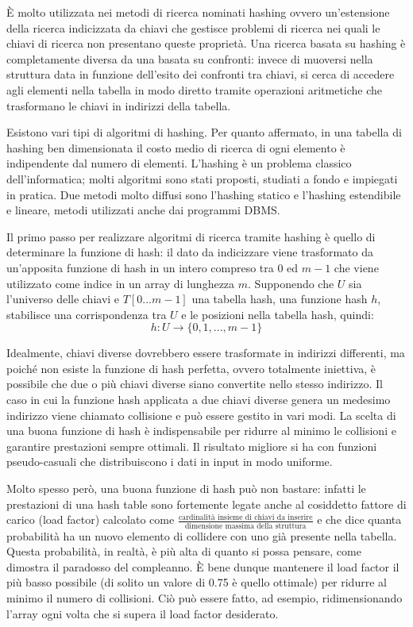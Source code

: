 \documentclass[binding=0.6cm]{sapthesis}
\theoremstyle{definition}
\begin{document}
È molto utilizzata nei metodi di ricerca nominati hashing ovvero un'estensione 
della ricerca indicizzata da chiavi che gestisce problemi di ricerca nei quali le chiavi di 
ricerca non presentano queste proprietà. Una ricerca basata su hashing è completamente diversa 
da una basata su confronti: invece di muoversi nella struttura data in funzione dell'esito dei 
confronti tra chiavi, si cerca di accedere agli elementi nella tabella in modo diretto tramite 
operazioni aritmetiche che trasformano le chiavi in indirizzi della tabella. 

Esistono vari tipi di algoritmi di hashing. Per quanto affermato, in una tabella di hashing 
ben dimensionata il costo medio di ricerca di ogni elemento è indipendente dal numero di elementi.
L'hashing è un problema classico dell'informatica; molti algoritmi sono stati proposti, studiati
a fondo e impiegati in pratica. Due metodi molto diffusi sono l'hashing statico e l'hashing 
estendibile e lineare, metodi utilizzati anche dai programmi DBMS. 

Il primo passo per realizzare algoritmi di ricerca tramite hashing è quello di determinare 
la funzione di hash: il dato da indicizzare viene trasformato da un'apposita funzione di hash 
in un intero compreso tra $0 $ ed $m-1$ 
che viene utilizzato come indice in un array di lunghezza $m$. Supponendo che $U$
sia l'universo delle chiavi e $T [0... m-1]$  una tabella 
hash, una funzione hash $h$, stabilisce una corrispondenza tra $U$ e le posizioni
nella tabella hash, quindi:
\begin{displaymath}
    h:U \to \{0,1,...,m-1\}
\end{displaymath}

Idealmente, chiavi diverse dovrebbero essere trasformate in indirizzi differenti, 
ma poiché non esiste la funzione di hash perfetta, ovvero totalmente iniettiva,
è possibile che due o più chiavi diverse siano convertite nello stesso indirizzo.
Il caso in cui la funzione hash applicata a due chiavi diverse genera un medesimo 
indirizzo viene chiamato collisione e può essere gestito in vari modi.
La scelta di una buona funzione di hash è indispensabile per ridurre al minimo 
le collisioni e garantire prestazioni sempre ottimali. Il risultato migliore
si ha con funzioni pseudo-casuali che distribuiscono i dati in input in modo uniforme. 

Molto spesso però, una buona funzione di hash può non bastare: infatti le prestazioni 
di una hash table sono fortemente legate anche al cosiddetto fattore di carico (load factor)
calcolato come $   \frac{\text{cardinalità insieme di chiavi da inserire}}{\text{dimensione massima della struttura} }$ 
e che dice quanta probabilità ha un nuovo elemento di collidere con uno già presente nella tabella.
Questa probabilità, in realtà, è più alta di quanto si possa pensare, come dimostra il 
paradosso del compleanno. È bene dunque mantenere il load factor il più basso possibile
(di solito un valore di 0.75 è quello ottimale) per ridurre al minimo il numero di collisioni. 
Ciò può essere fatto, ad esempio, ridimensionando l'array ogni volta che si supera il load 
factor desiderato. 
\end{document}

